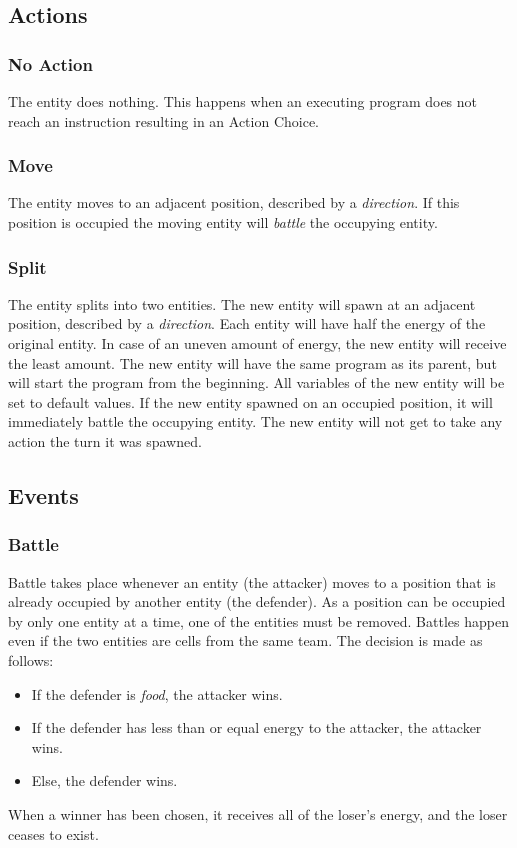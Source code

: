 \subsection{Actions}

\subsubsection{No Action}
The entity does nothing. This happens when an executing program does not reach an instruction resulting in an Action Choice.

\subsubsection{Move}
The entity moves to an adjacent position, described by a \emph{direction}. If this position is occupied the moving entity will \emph{battle} the occupying entity.

\subsubsection{Split}
The entity splits into two entities. The new entity will spawn at an adjacent position, described by a \emph{direction}. Each entity will have half the energy of the original entity. In case of an uneven amount of energy, the new entity will receive the least amount. The new entity will have the same program as its parent, but will start the program from the beginning. All variables of the new entity will be set to default values. If the new entity spawned on an occupied position, it will immediately battle the occupying entity. The new entity will not get to take any action the turn it was spawned.

\subsection{Events}

\subsubsection{Battle}

Battle takes place whenever an entity (the attacker) moves to a position that is already occupied by another entity (the defender). As a position can be occupied by only one entity at a time, one of the entities must be removed. Battles happen even if the two entities are cells from the same team. The decision is made as follows:
\begin{itemize}
\item If the defender is \emph{food}, the attacker wins.
\item If the defender has less than or equal energy to the attacker, the attacker wins.
\item Else, the defender wins.
\end{itemize}
When a winner has been chosen, it receives all of the loser's energy, and the loser ceases to exist.

